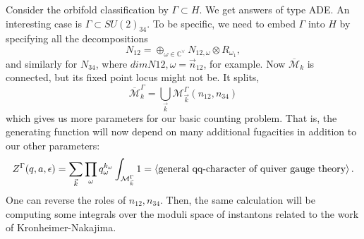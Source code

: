 \documentclass[leqno, openany]{memoir}
\theoremstyle{definition}
\theoremstyle{remark}
\theoremstyle{plain}
\theoremstyle{definition}
\theoremstyle{remark}
\begin{document}
Consider the orbifold classification by $\Gamma \subset H$. We 
get answers of type ADE. An interesting case is $\Gamma \subset SU(2)_{34}$. 
To be specific, we need to embed $\Gamma$ into $H$ by specifying all the decompositions
\[
N_{12} = \oplus_{\omega \in \mathbb{C}^\vee} N_{12, \omega}\otimes R_{\omega_1},
\]
and similarly for $N_{34}$, 
where $dim N{12,\omega} = \vec{n}_{12}$, for example. 
Now $\overline{\mathcal{M}}_k$ is connected, but its fixed point locus might not be. It splits, 
\[
\overline{\mathcal{M}}_k^\Gamma = \bigcup_{\vec{k}} \mathcal{M}_{\vec{k}}^\Gamma (n_{12}, n_{34})
\]
which gives us more parameters for our basic counting problem. 
That is, the generating function will now depend on many additional fugacities in addition to our other parameters: 
\[
    Z^\Gamma(q,a,\epsilon) = \sum_{\vec{k}} \prod_\omega q_\omega^{k_\omega} \int_{\mathcal{M}_{\vec{k}}^\Gamma} 1 = \ev{\text{general qq-character of quiver gauge theory}}.
\]
One can reverse the roles of $n_{12},n_{34}$. Then, the same calculation will be computing some integrals over the moduli space of instantons 
related to the work of Kronheimer-Nakajima. 
\end{document}
